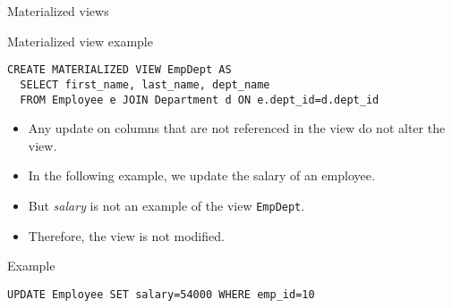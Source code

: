 \documentclass[xcolor=table]{beamer}
\begin{document}
\begin{frame}[fragile]{Materialized views}
  \begin{block}{Materialized view example}
    \footnotesize
\begin{verbatim}
CREATE MATERIALIZED VIEW EmpDept AS
  SELECT first_name, last_name, dept_name
  FROM Employee e JOIN Department d ON e.dept_id=d.dept_id
\end{verbatim}
  \end{block}
  \vfill
\begin{itemize}
  \item Any update on columns that are not referenced in the view do not alter the 
  view.
  \item In the following example, we update the salary of an employee.
  \item But {\em salary} is not an example of the view \texttt{EmpDept}.
  \item Therefore, the view is not modified.
\end{itemize}
\vfill
\begin{exampleblock}{Example}
\footnotesize
\begin{verbatim}
UPDATE Employee SET salary=54000 WHERE emp_id=10
\end{verbatim}

\end{exampleblock}
\end{frame}
\end{document}
